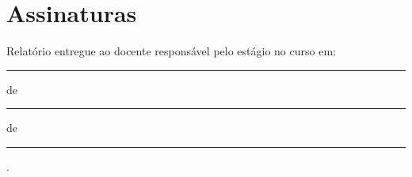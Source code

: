 \chapter[ASSINATURAS]{Assinaturas}


\vspace{1em}

Relatório entregue ao docente responsável pelo estágio no curso em: \rule{1cm}{0.1pt} de \rule{2.5cm}{0.1pt} de \rule{1.5cm}{0.1pt}.

